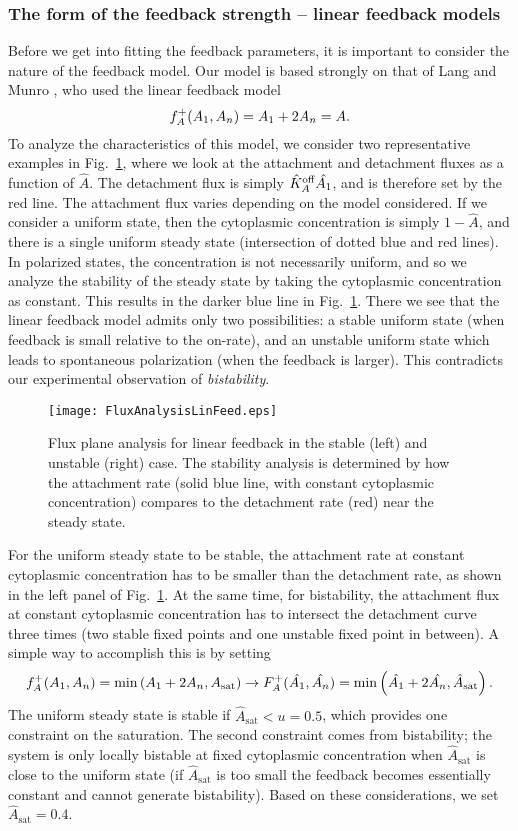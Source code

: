 \documentclass[11pt]{article}
\newcommand{\6}[1]{#1_{\text{6}}}
\newcommand{\3}[1]{#1_{\text{3}}}
\begin{document}
\subsubsection{The form of the feedback strength -- linear feedback models}
Before we get into fitting the feedback parameters, it is important to consider the nature of the feedback model. Our model is based strongly on that of Lang and Munro \cite{lang2022oligomerization}, who used the linear feedback model $$f_A^+(A_1,A_n)=A_1+2A_n=A.$$ 
To analyze the characteristics of this model, we consider two representative examples in Fig.\ \ref{fig:P3Linear}, where we look at the attachment and detachment fluxes as a function of $\hat A$. The detachment flux is simply $\hat{K}^\text{off}_A \hat {A_1}$, and is therefore set by the red line. The attachment flux varies depending on the model considered. If we consider a uniform state, then the cytoplasmic concentration is simply $1-\hat A$, and there is a single uniform steady state (intersection of dotted blue and red lines). In polarized states, the concentration is not necessarily uniform, and so we analyze the stability of the steady state by taking the cytoplasmic concentration as constant. This results in the darker blue line in Fig.\ \ref{fig:P3Linear}. There we see that the linear feedback model admits only two possibilities: a stable uniform state (when feedback is small relative to the on-rate), and an unstable uniform state which leads to spontaneous polarization (when the feedback is larger). This contradicts our experimental observation of \emph{bistability}.

\begin{figure}
\centering
\texttt{[image: FluxAnalysisLinFeed.eps]}
\caption{\label{fig:P3Linear}Flux plane analysis for linear feedback in the stable (left) and unstable (right) case. The stability analysis is determined by how the attachment rate (solid blue line, with constant cytoplasmic concentration) compares to the detachment rate (red) near the steady state.}
\end{figure}

For the uniform steady state to be stable, the attachment rate at constant cytoplasmic concentration has to be smaller than the detachment rate, as shown in the left panel of Fig.\ \ref{fig:P3Linear}. At the same time, for bistability, the attachment flux at constant cytoplasmic concentration has to intersect the detachment curve three times (two stable fixed points and one unstable fixed point in between). A simple way to accomplish this is by setting
\begin{equation}
f_A^+(A_1,A_n) =\min\left(A_1+2A_n,A_\text{sat}\right) \rightarrow F_A^+(\hat {A_1}, \hat {A_n}) = \min\left(\hat {A_1}+2\hat {A_n}, \hat A_\text{sat}\right). 
\end{equation}
The uniform steady state is stable if $\hat A_\text{sat} < u = 0.5$, which provides one constraint on the saturation. The second constraint comes from bistability; the system is only locally bistable at fixed cytoplasmic concentration when $\hat A_\text{sat}$ is close to the uniform state (if $\hat A_\text{sat}$ is too small the feedback becomes essentially constant and cannot generate bistability). Based on these considerations, we set $\hat A_\text{sat}=0.4$. 
\end{document}
